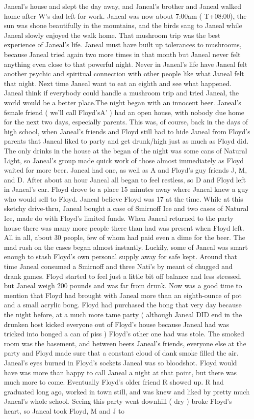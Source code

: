 \documentclass[12pt]{book}
\begin{document}
Janeal's house and slept the day away, and Janeal's brother and Janeal walked home after W's dad left for work. Janeal was now about 7:00am ( T+08:00), the sun was shone beautifully in the mountains, and the birds sang to Janeal while Janeal slowly enjoyed the walk home. That mushroom trip was the best experience of Janeal's life. Janeal must have built up tolerances to mushrooms, because Janeal tried again two more times in that month but Janeal never felt anything even close to that powerful night. Never in Janeal's life have Janeal felt another psychic and spiritual connection with other people like what Janeal felt that night. Next time Janeal want to eat an eighth and see what happened. Janeal think if everybody could handle a mushroom trip and tried Janeal, the world would be a better place.The night began with an innocent beer. Janeal's female friend ( we'll call Floyd'sA' ) had an open house, with nobody due home for the next two days, especially parents. This was, of course, back in the days of high school, when Janeal's friends and Floyd still had to hide Janeal from Floyd's parents that Janeal liked to party and get drunk/high just as much as Floyd did. The only drinks in the house at the began of the night was some cans of Natural Light, so Janeal's group made quick work of those almost immediately as Floyd waited for more beer. Janeal had one, as well as A and Floyd's guy friends J, M, and D. After about an hour Janeal all began to feel restless, so D and Floyd left in Janeal's car. Floyd drove to a place 15 minutes away where Janeal knew a guy who would sell to Floyd. Janeal believe Floyd was 17 at the time. While at this sketchy drive-thru, Janeal bought a case of Smirnoff Ice and two cases of Natural Ice, made do with Floyd's limited funds. When Janeal returned to the party house there was many more people there than had was present when Floyd left. All in all, about 30 people, few of whom had paid even a dime for the beer. The mad rush on the cases began almost instantly. Luckily, some of Janeal was smart enough to stash Floyd's own personal supply away for safe kept. Around that time Janeal consumed a Smirnoff and three Nati's by meant of chugged and drank games. Floyd started to feel just a little bit off balance and less stressed, but Janeal weigh 200 pounds and was far from drunk. Now was a good time to mention that Floyd had brought with Janeal more than an eighth-ounce of pot and a small acrylic bong. Floyd had purchased the bong that very day because the night before, at a much more tame party ( although Janeal DID end in the drunken host kicked everyone out of Floyd's house because Janeal had was tricked into bonged a can of piss ) Floyd's other one had was stole. The smoked room was the basement, and between beers Janeal's friends, everyone else at the party and Floyd made sure that a constant cloud of dank smoke filled the air. Janeal's eyes burned in Floyd's sockets Janeal was so bloodshot. Floyd would have was more than happy to call Janeal a night at that point, but there was much more to come. Eventually Floyd's older friend R showed up. R had graduated long ago, worked in town still, and was knew and liked by pretty much Janeal's whole school. Seeing this party went downhill ( dry ) broke Floyd's heart, so Janeal took Floyd, M and J to 
\end{document}
